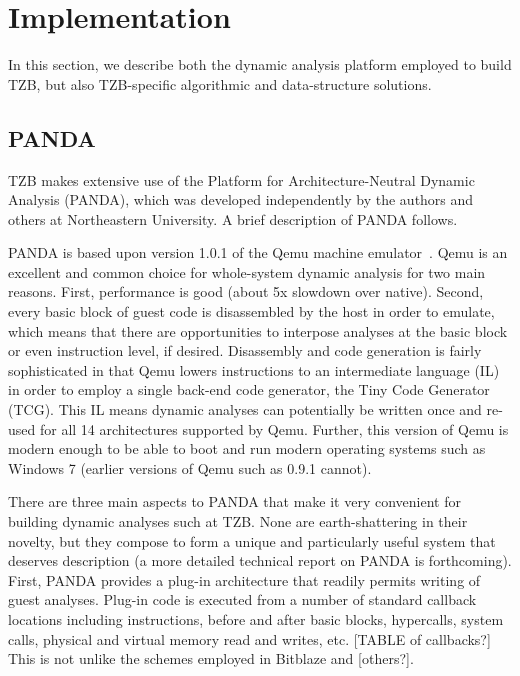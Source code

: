 \section{Implementation}
\label{sec:implementation}

In this section, we describe both the dynamic analysis platform employed to build TZB, but also TZB-specific algorithmic and data-structure solutions.

\subsection{PANDA}
\label{sec:implementation:subsec:panda}

TZB makes extensive use of the Platform for Architecture-Neutral Dynamic Analysis (PANDA), which was developed independently by the authors and others at Northeastern University.
A brief description of PANDA follows.

PANDA is based upon version 1.0.1 of the Qemu machine emulator~\cite{Bellard:2005}.
Qemu is an excellent and common choice for whole-system dynamic analysis for two main reasons.
First, performance is good (about 5x slowdown over native).
Second, every basic block of guest code is disassembled by the host in order to emulate, which means that there are opportunities to interpose analyses at the basic block or even instruction level, if desired.
Disassembly and code generation is fairly sophisticated in that Qemu lowers instructions to an intermediate language (IL) in order to employ a single back-end code generator, the Tiny Code Generator (TCG).  
This IL means dynamic analyses can potentially be written once and re-used for all 14 architectures supported by Qemu.
Further, this version of Qemu is modern enough to be able to boot and run modern operating systems such as Windows 7 (earlier versions of Qemu such as 0.9.1 cannot).

There are three main aspects to PANDA that make it very convenient for building dynamic analyses such at TZB.
None are earth-shattering in their novelty, but they compose to form a unique and particularly useful system that deserves description (a more detailed technical report on PANDA is forthcoming).
First, PANDA provides a plug-in architecture that readily permits writing of guest analyses.
Plug-in code is executed from a number of standard callback locations including instructions, before and after basic blocks, hypercalls, system calls, physical and virtual memory read and writes, etc.  
[TABLE of callbacks?]
This is not unlike the schemes employed in Bitblaze and [others?]\cite{Song:2008bitblaze}.

